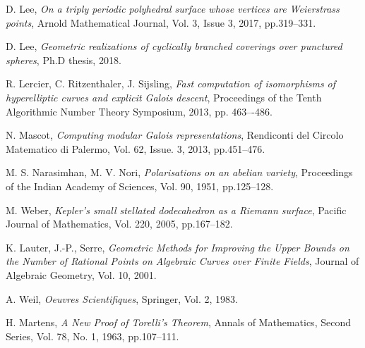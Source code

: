\documentclass[12pt,reqno]{amsart}
\theoremstyle{definition}
\theoremstyle{remark}
\begin{document}
\begin{thebibliography}{20}
D. Lee,
\textit{On a triply periodic polyhedral surface whose vertices are Weierstrass points},
Arnold Mathematical Journal, 
Vol. 3, Issue 3, 2017, pp.319--331.

D. Lee, 
\textit{Geometric realizations of cyclically branched coverings over punctured spheres}, 
Ph.D thesis, 2018.
 
 
R. Lercier, C. Ritzenthaler, J. Sijsling,
\textit{Fast computation of isomorphisms of hyperelliptic curves and explicit Galois descent},
Proceedings of the Tenth Algorithmic Number Theory Symposium, 2013, pp. 463–-486.

N. Mascot,
\textit{Computing modular Galois representations},
Rendiconti del Circolo Matematico di Palermo,
Vol. 62, Issue. 3, 2013, pp.451--476.

M. S. Narasimhan, M. V. Nori,
\textit{Polarisations on an abelian variety},
Proceedings of the Indian Academy of Sciences,
Vol. 90, 1951, pp.125--128.


M. Weber,
\textit{Kepler's small stellated dodecahedron as a Riemann surface},
Pacific Journal of Mathematics, 
Vol. 220, 2005, pp.167--182.

K. Lauter, J.-P., Serre, 
\textit{Geometric Methods for Improving the Upper Bounds on the Number of Rational Points on Algebraic Curves over Finite Fields}, 
Journal of Algebraic Geometry,
Vol. 10, 2001.

A. Weil,
\textit{Oeuvres Scientifiques},
Springer,
Vol. 2, 1983.

H. Martens,
\textit{A New Proof of Torelli's Theorem},
Annals of Mathematics,
Second Series, Vol. 78, No. 1, 1963, pp.107--111.


\end{thebibliography}
\end{document}
